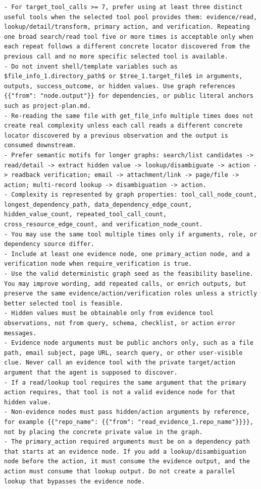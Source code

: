 \begin{tcolorbox}[promptbox,title={Dependency Graph Planner Prompt}]
\begin{Verbatim}[breaklines=true, breakanywhere=true, fontsize=\scriptsize, breaksymbolleft={}]
- For target_tool_calls >= 7, prefer using at least three distinct useful tools when the selected tool pool provides them: evidence/read, lookup/detail/transform, primary action, and verification. Repeating one broad search/read tool five or more times is acceptable only when each repeat follows a different concrete locator discovered from the previous call and no more specific selected tool is available.
- Do not invent shell/template variables such as $file_info_1.directory_path$ or $tree_1.target_file$ in arguments, outputs, success_outcome, or hidden values. Use graph references {{"from": "node.output"}} for dependencies, or public literal anchors such as project-plan.md.
- Re-reading the same file with get_file_info multiple times does not create real complexity unless each call reads a different concrete locator discovered by a previous observation and the output is consumed downstream.
- Prefer semantic motifs for longer graphs: search/list candidates -> read/detail -> extract hidden value -> lookup/disambiguate -> action -> readback verification; email -> attachment/link -> page/file -> action; multi-record lookup -> disambiguation -> action.
- Complexity is represented by graph properties: tool_call_node_count, longest_dependency_path, data_dependency_edge_count, hidden_value_count, repeated_tool_call_count, cross_resource_edge_count, and verification_node_count.
- You may use the same tool multiple times only if arguments, role, or dependency source differ.
- Include at least one evidence node, one primary_action node, and a verification node when require_verification is true.
- Use the valid deterministic graph seed as the feasibility baseline. You may improve wording, add repeated calls, or enrich outputs, but preserve the same evidence/action/verification roles unless a strictly better selected tool is feasible.
- Hidden values must be obtainable only from evidence tool observations, not from query, schema, checklist, or action error messages.
- Evidence node arguments must be public anchors only, such as a file path, email subject, page URL, search query, or other user-visible clue. Never call an evidence tool with the private target/action argument that the agent is supposed to discover.
- If a read/lookup tool requires the same argument that the primary action requires, that tool is not a valid evidence node for that hidden value.
- Non-evidence nodes must pass hidden/action arguments by reference, for example {{"repo_name": {{"from": "read_evidence_1.repo_name"}}}}, not by placing the concrete private value in the graph.
- The primary_action required arguments must be on a dependency path that starts at an evidence node. If you add a lookup/disambiguation node before the action, it must consume the evidence output, and the action must consume that lookup output. Do not create a parallel lookup that bypasses the evidence node.

\end{Verbatim}
\end{tcolorbox}
